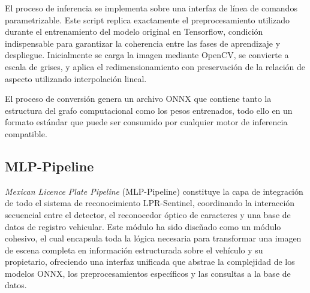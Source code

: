 El proceso de inferencia se implementa sobre una interfaz de línea de comandos parametrizable. Este script replica exactamente el preprocesamiento utilizado durante el entrenamiento del modelo original en Tensorflow, condición indispensable para garantizar la coherencia entre las fases de aprendizaje y despliegue. Inicialmente se carga la imagen mediante OpenCV, se convierte a escala de grises, y aplica el redimensionamiento con preservación de la relación de aspecto utilizando interpolación lineal.

El proceso de conversión genera un archivo ONNX que contiene tanto la estructura del grafo computacional como los pesos entrenados, todo ello en un formato estándar que puede ser consumido por cualquier motor de inferencia compatible.

\subsection*{MLP-Pipeline}
\textit{Mexican Licence Plate Pipeline} (MLP-Pipeline) constituye la capa de integración de todo el sistema de reconocimiento LPR-Sentinel, coordinando la interacción secuencial entre el detector, el reconocedor óptico de caracteres y una base de datos de registro vehicular. Este módulo ha sido diseñado como un módulo cohesivo, el cual encapsula toda la lógica necesaria para transformar una imagen de escena completa en información estructurada sobre el vehículo y su propietario, ofreciendo una interfaz unificada que abstrae la complejidad de los modelos ONNX, los preprocesamientos específicos y las consultas a la base de datos.

